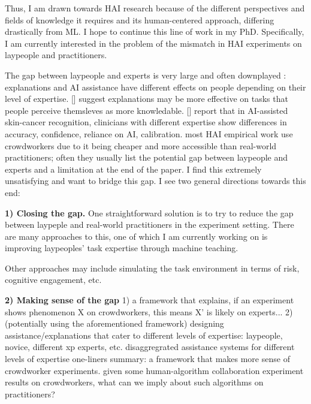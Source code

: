


Thus, I am drawn towards HAI research because of the different perspectives and fields of knowledge it requires and its human-centered approach, differing drastically from ML. 
I hope to continue this line of work in my PhD.
Specifically, I am currently interested in the problem of the mismatch in HAI experiments on laypeople and practitioners.

The gap between laypeople and experts is very large and often downplayed : explanations and AI assistance have different effects on people depending on their level of expertise. [] suggest explanations may be more effective on tasks that people perceive themsleves as more knowledable. [] report that in AI-assisted skin-cancer recognition, clinicians with different expertise show differences in accuracy, confidence, reliance on AI, calibration. 
most HAI empirical work use crowdworkers due to it being cheaper and more accessible than real-world practitioners; often they usually list the potential gap between laypeople and experts and a limitation at the end of the paper. I find this extremely unsatisfying and want to bridge this gap. I see two general directions towards this end:

\noindent \textbf{1) Closing the gap.}
One straightforward solution is to try to reduce the gap between laypeple and real-world practitioners in the experiment setting. 
There are many approaches to this, one of which I am currently working on is improving laypeoples' task expertise through machine teaching.

Other approaches may include simulating the task environment in terms of risk, cognitive engagement, etc.

\noindent \textbf{2) Making sense of the gap}
1) a framework that explains, if an experiment shows phenomenon X on crowdworkers, this means X' is likely on experts...
2) (potentially using the aforementioned framework) designing assistance/explanations that cater to different levels of expertise: laypeople, novice, different xp experts, etc.
disaggregrated assistance systems for different levels of expertise
one-liners summary: 
a framework that makes more sense of crowdworker experiments. given some human-algorithm collaboration experiment results on crowdworkers, what can we imply about such algorithms on practitioners?





